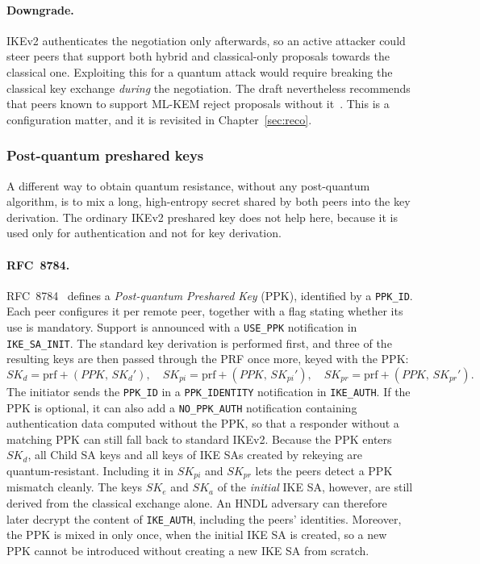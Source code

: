 \paragraph{Downgrade.}
IKEv2 authenticates the negotiation only afterwards, so an active attacker
could steer peers that support both hybrid and classical-only proposals
towards the classical one. Exploiting this for a quantum attack would require
breaking the classical key exchange \emph{during} the negotiation. The draft
nevertheless recommends that peers known to support ML-KEM reject proposals
without it~\cite{ikev2mlkem}. This is a configuration matter, and it is
revisited in Chapter~\ref{sec:reco}.

\subsubsection{Post-quantum preshared keys}
\label{sec:sota-ppk}

A different way to obtain quantum resistance, without any post-quantum
algorithm, is to mix a long, high-entropy secret shared by both peers into the
key derivation. The ordinary IKEv2 preshared key does not help here, because it
is used only for authentication and not for key derivation.

\paragraph{RFC~8784.}
RFC~8784~\cite{rfc8784} defines a \emph{Post-quantum Preshared Key} (PPK),
identified by a \texttt{PPK\_ID}. Each peer configures it per remote peer,
together with a flag stating whether its use is mandatory. Support is
announced with a \texttt{USE\_PPK} notification in \texttt{IKE\_SA\_INIT}. The
standard key derivation is performed first, and three of the resulting keys
are then passed through the PRF once more, keyed with the PPK:
\begin{equation}
    SK_d = \mathrm{prf+}(\mathit{PPK},\, SK_d'), \quad
    SK_{pi} = \mathrm{prf+}(\mathit{PPK},\, SK_{pi}'), \quad
    SK_{pr} = \mathrm{prf+}(\mathit{PPK},\, SK_{pr}').
\end{equation}
The initiator sends the \texttt{PPK\_ID} in a \texttt{PPK\_IDENTITY}
notification in \texttt{IKE\_AUTH}. If the PPK is optional, it can also add a
\texttt{NO\_PPK\_AUTH} notification containing authentication data computed
without the PPK, so that a responder without a matching PPK can still fall
back to standard IKEv2. Because the PPK enters $SK_d$, all Child SA keys and
all keys of IKE SAs created by rekeying are quantum-resistant. Including it in
$SK_{pi}$ and $SK_{pr}$ lets the peers detect a PPK mismatch cleanly. The keys
$SK_e$ and $SK_a$ of the \emph{initial} IKE SA, however, are still derived from
the classical exchange alone. An HNDL adversary can therefore later decrypt the
content of \texttt{IKE\_AUTH}, including the peers' identities. Moreover, the
PPK is mixed in only once, when the initial IKE SA is created, so a new PPK
cannot be introduced without creating a new IKE SA from scratch.

